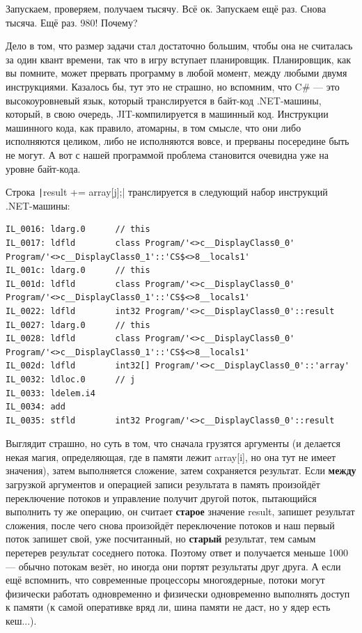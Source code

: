 \documentclass{../../text-style}
\begin{document}
Запускаем, проверяем, получаем тысячу. Всё ок. Запускаем ещё раз. Снова тысяча. Ещё раз. 980! Почему?

Дело в том, что размер задачи стал достаточно большим, чтобы она не считалась за один квант времени, так что в игру вступает планировщик. Планировщик, как вы помните, может прервать программу в любой момент, между любыми двумя инструкциями. Казалось бы, тут это не страшно, но вспомним, что C\# --- это высокоуровневый язык, который транслируется в байт-код .NET-машины, который, в свою очередь, JIT-компилируется в машинный код. Инструкции машинного кода, как правило, атомарны, в том смысле, что они либо исполняются целиком, либо не исполняются вовсе, и прерваны посередине быть не могут. А вот с нашей программой проблема становится очевидна уже на уровне байт-кода.

Строка \texttt|result += array[j];| транслируется в следующий набор инструкций .NET-машины:

\begin{footnotesize}
    \begin{verbatim}
IL_0016: ldarg.0      // this
IL_0017: ldfld        class Program/'<>c__DisplayClass0_0' Program/'<>c__DisplayClass0_1'::'CS$<>8__locals1'
IL_001c: ldarg.0      // this
IL_001d: ldfld        class Program/'<>c__DisplayClass0_0' Program/'<>c__DisplayClass0_1'::'CS$<>8__locals1'
IL_0022: ldfld        int32 Program/'<>c__DisplayClass0_0'::result
IL_0027: ldarg.0      // this
IL_0028: ldfld        class Program/'<>c__DisplayClass0_0' Program/'<>c__DisplayClass0_1'::'CS$<>8__locals1'
IL_002d: ldfld        int32[] Program/'<>c__DisplayClass0_0'::'array'
IL_0032: ldloc.0      // j
IL_0033: ldelem.i4    
IL_0034: add          
IL_0035: stfld        int32 Program/'<>c__DisplayClass0_0'::result
    \end{verbatim}
\end{footnotesize}

Выглядит страшно, но суть в том, что сначала грузятся аргументы (и делается некая магия, определяющая, где в памяти лежит array[i], но она тут не имеет значения), затем выполняется сложение, затем сохраняется результат. Если \textbf{между} загрузкой аргументов и операцией записи результата в память произойдёт переключение потоков и управление получит другой поток, пытающийся выполнить ту же операцию, он считает \textbf{старое} значение result, запишет результат сложения, после чего снова произойдёт переключение потоков и наш первый поток запишет свой, уже посчитанный, но \textbf{старый} результат, тем самым перетерев результат соседнего потока. Поэтому ответ и получается меньше 1000 --- обычно потокам везёт, но иногда они портят результаты друг друга. А если ещё вспомнить, что современные процессоры многоядерные, потоки могут физически работать одновременно и физически одновременно выполнять доступ к памяти (к самой оперативке вряд ли, шина памяти не даст, но у ядер есть кеш...).
\end{document}
